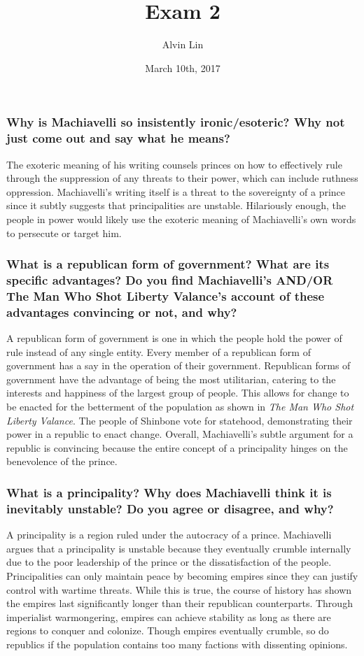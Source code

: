 \documentclass{article}
\title{Exam 2}
\author{Alvin Lin}
\date{March 10th, 2017}
\begin{document}
\maketitle

\subsubsection*{Why is Machiavelli so insistently ironic/esoteric? Why not
just come out and say what he means?}
The exoteric meaning of his writing counsels princes on how to effectively rule through the suppression of any threats to their power, which can include ruthness oppression. Machiavelli's writing itself is a threat to the sovereignty of a prince since it subtly suggests that principalities are unstable. Hilariously enough, the people in power would likely use the exoteric meaning of Machiavelli's own words to persecute or target him.

\subsubsection*{What is a republican form of government? What are its specific
advantages? Do you find Machiavelli’s AND/OR The Man Who Shot Liberty Valance’s
account of these advantages convincing or not, and why?}
A republican form of government is one in which the people hold the power of rule instead of any single entity. Every member of a republican form of government has a say in the operation of their government. Republican forms of government have the advantage of being the most utilitarian, catering to the interests and happiness of the largest group of people. This allows for change to be enacted for the betterment of the population as shown in \textit{The Man Who Shot Liberty Valance}. The people of Shinbone vote for statehood, demonstrating their power in a republic to enact change. Overall, Machiavelli's subtle argument for a republic is convincing because the entire concept of a principality hinges on the benevolence of the prince.

\subsubsection*{What is a principality? Why does Machiavelli think it is
inevitably unstable? Do you agree or disagree, and why?}
A principality is a region ruled under the autocracy of a prince. Machiavelli argues that a principality is unstable because they eventually crumble internally due to the poor leadership of the prince or the dissatisfaction of the people. Principalities can only maintain peace by becoming empires since they can justify control with wartime threats. While this is true, the course of history has shown the empires last significantly longer than their republican counterparts. Through imperialist warmongering, empires can achieve stability as long as there are regions to conquer and colonize. Though empires eventually crumble, so do republics if the population contains too many factions with dissenting opinions.
\end{document}
